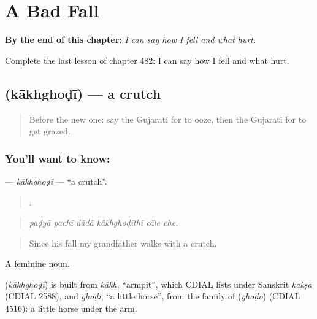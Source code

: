 
\chapter{A Bad Fall}
\label{ch:gu-a-bad-fall}

\begin{chapteropening}
\textbf{By the end of this chapter:} \emph{I can say how I fell and what hurt.}

Complete the last lesson of chapter 482: I can say how I fell and what hurt.
\end{chapteropening}

\section[\texorpdfstring{\gu{કાખઘોડી} (kākhghoḍī)}{કાખઘોડી (kākhghoḍī)}]{ (kākhghoḍī) — a crutch}

\label{lesson:GU-C482-kakhghodi}



\begin{quote}
Before the new one: say the Gujarati for to ooze, then the Gujarati for to get grazed.
\end{quote}

\subsection*{You'll want to know: }
\textbf{} — \emph{kākhghoḍī} — \textquotedblleft{}a crutch\textquotedblright{}.

\begin{quote}
     .
\end{quote}

\begin{quote}
\emph{paḍyā pachī dādā kākhghoḍīthī cāle che.}
\end{quote}

\begin{quote}
Since his fall my grandfather walks with a crutch.
\end{quote}

A feminine noun.

\begin{cousinweb}
\textbf{} (\emph{kākhghoḍī}) is built from \emph{kākh}, \textquotedblleft{}armpit\textquotedblright{}, which CDIAL lists under Sanskrit \emph{kakṣa} (CDIAL 2588), and \emph{ghoḍī}, \textquotedblleft{}a little horse\textquotedblright{}, from the family of \textbf{} (\emph{ghoḍo}) (CDIAL 4516): a little horse under the arm.
\end{cousinweb}

